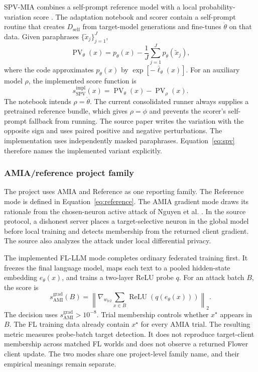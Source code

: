 \documentclass[11pt]{article}
\begin{document}
SPV-MIA combines a self-prompt reference model with a local probability-variation score \citep{fu2024membership}. The adaptation notebook and scorer contain a self-prompt routine that creates $D_{\mathrm{self}}$ from target-model generations and fine-tunes $\dot\theta$ on that data. Given paraphrases $\{\widetilde x_j\}_{j=1}^{J}$,
\begin{equation}
    \operatorname{PV}_\theta(x)=p_\theta(x)-\frac{1}{J}\sum_{j=1}^{J}p_\theta(\widetilde x_j),
\end{equation}
where the code approximates $p_\theta(x)$ by $\exp[-\bar\ell_\theta(x)]$. For an auxiliary model $\rho$, the implemented score function is
\begin{equation}
    s_{\mathrm{SPV}}^{\mathrm{impl}}(x)=
    \operatorname{PV}_\theta(x)-\operatorname{PV}_{\rho}(x).
    \label{eq:spv}
\end{equation}
The notebook intends $\rho=\dot\theta$. The current consolidated runner always supplies a pretrained reference bundle, which gives $\rho=\phi$ and prevents the scorer's self-prompt fallback from running. The source paper writes the variation with the opposite sign and uses paired positive and negative perturbations. The implementation uses independently masked paraphrases. Equation~\ref{eq:spv} therefore names the implemented variant explicitly.

\subsubsection{AMIA/reference project family}

The project uses AMIA and Reference as one reporting family. The Reference mode is defined in Equation~\ref{eq:reference}. The AMIA gradient mode draws its rationale from the chosen-neuron active attack of Nguyen et al. \citep{nguyen2023active}. In the source protocol, a dishonest server places a target-selective neuron in the global model before local training and detects membership from the returned client gradient. The source also analyzes the attack under local differential privacy.

The implemented FL-LLM mode completes ordinary federated training first. It freezes the final language model, maps each text to a pooled hidden-state embedding $e_\theta(x)$, and trains a two-layer ReLU probe $q$. For an attack batch $B$, the score is
\begin{equation}
    s_{\mathrm{AMI}}^{\mathrm{grad}}(B)=
    \left\|\nabla_{w_{\mathrm{fc2}}}
    \sum_{x\in B}\operatorname{ReLU}(q(e_\theta(x)))\right\|_2.
    \label{eq:amia}
\end{equation}
The decision uses $s_{\mathrm{AMI}}^{\mathrm{grad}}>10^{-8}$. Trial membership controls whether $x^\star$ appears in $B$. The FL training data already contain $x^\star$ for every AMIA trial. The resulting metric measures probe-batch target detection. It does not reproduce target-client membership across matched FL worlds and does not observe a returned Flower client update. The two modes share one project-level family name, and their empirical meanings remain separate.
\end{document}
